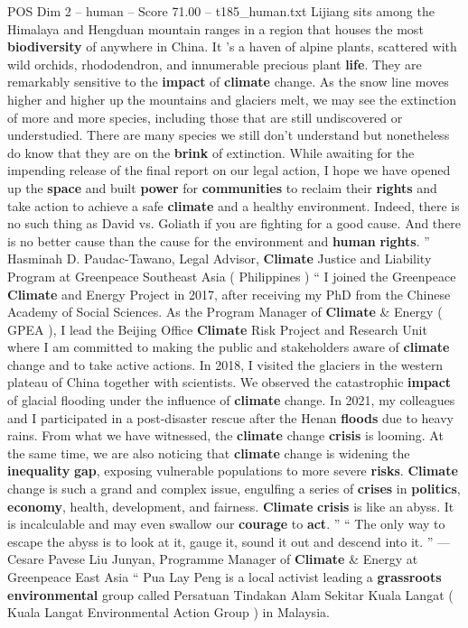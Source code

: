 \begin{textsample}{POS Dim 2 – human – Score 71.00 – t185\_human.txt}
Lijiang sits among the Himalaya and Hengduan mountain ranges in a region that houses the most \textbf{biodiversity} of anywhere in China.
It ’s a haven of alpine plants, scattered with wild orchids, rhododendron, and innumerable precious plant \textbf{life}.
They are remarkably sensitive to the \textbf{impact} of \textbf{climate} change.
As the snow line moves higher and higher up the mountains and glaciers melt, we may see the extinction of more and more species, including those that are still undiscovered or understudied.
There are many species we still don't understand but nonetheless do know that they are on the \textbf{brink} of extinction.
While awaiting for the impending release of the final report on our legal action, I hope we have opened up the \textbf{space} and built \textbf{power} for \textbf{communities} to reclaim their \textbf{rights} and take action to achieve a safe \textbf{climate} and a healthy environment.
Indeed, there is no such thing as David vs.
Goliath if you are fighting for a good cause.
And there is no better cause than the cause for the environment and \textbf{human} \textbf{rights}. ” Hasminah D.
Paudac-Tawano, Legal Advisor, \textbf{Climate} Justice and Liability Program at Greenpeace Southeast Asia ( Philippines ) “ I joined the Greenpeace \textbf{Climate} and Energy Project in 2017, after receiving my PhD from the Chinese Academy of Social Sciences.
As the Program Manager of \textbf{Climate} \& Energy ( GPEA ), I lead the Beijing Office \textbf{Climate} Risk Project and Research Unit where I am committed to making the public and stakeholders aware of \textbf{climate} change and to take active actions.
In 2018, I visited the glaciers in the western plateau of China together with scientists.
We observed the catastrophic \textbf{impact} of glacial flooding under the influence of \textbf{climate} change.
In 2021, my colleagues and I participated in a post-disaster rescue after the Henan \textbf{floods} due to heavy rains.
From what we have witnessed, the \textbf{climate} change \textbf{crisis} is looming.
At the same time, we are also noticing that \textbf{climate} change is widening the \textbf{inequality} \textbf{gap}, exposing vulnerable populations to more severe \textbf{risks}. \textbf{Climate} change is such a grand and complex issue, engulfing a series of \textbf{crises} in \textbf{politics}, \textbf{economy}, health, development, and fairness. \textbf{Climate} \textbf{crisis} is like an abyss.
It is incalculable and may even swallow our \textbf{courage} to \textbf{act}. ” “ The only way to escape the abyss is to look at it, gauge it, sound it out and descend into it. ” — Cesare Pavese Liu Junyan, Programme Manager of \textbf{Climate} \& Energy at Greenpeace East Asia “ Pua Lay Peng is a local activist leading a \textbf{grassroots} \textbf{environmental} group called Persatuan Tindakan Alam Sekitar Kuala Langat ( Kuala Langat Environmental Action Group ) in Malaysia.

\end{textsample}
